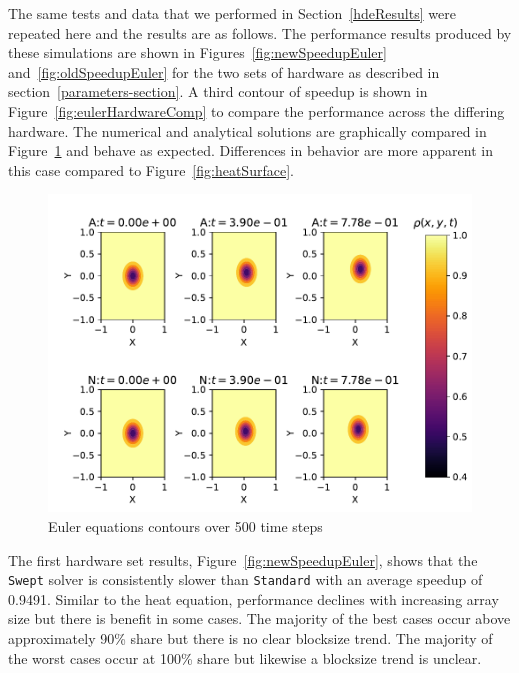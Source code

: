 \documentclass[review]{elsarticle}
\def\Swept{\texttt{Swept}}
\def\Standard{\texttt{Standard}}
\begin{document}
The same tests and data that we performed in Section~\ref{hdeResults} were repeated here and the results are as follows. The performance results produced by these simulations are shown in Figures~\ref{fig:newSpeedupEuler} and~\ref{fig:oldSpeedupEuler} for the two sets of hardware as described in section~\ref{parameters-section}. A third contour of speedup is shown in Figure~\ref{fig:eulerHardwareComp} to compare the performance across  the differing hardware. The numerical and analytical solutions are graphically compared in Figure~\ref{fig:eulerSurface} and behave as expected. Differences in behavior are more apparent in this case compared to Figure~\ref{fig:heatSurface}. 

\begin{figure}[htb!]
    \centering
    \includegraphics{figs/eulerValidate.pdf}
    \caption{Euler equations contours over 500 time steps}
    \label{fig:eulerSurface}
\end{figure}

The first hardware set results, Figure~\ref{fig:newSpeedupEuler}, shows that the \Swept{} solver is consistently slower than \Standard{} with an average speedup of 0.9491. Similar to the heat equation, performance declines with increasing array size but there is benefit in some cases. The majority of the best cases occur above approximately 90\% share but there is no clear blocksize trend. The majority of the worst cases occur at 100\% share but likewise a blocksize trend is unclear.
\end{document}
